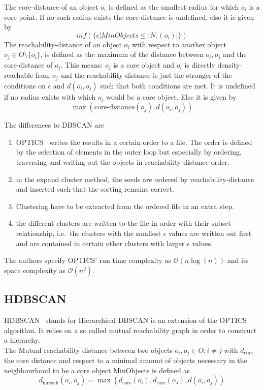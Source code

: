 \noindent The core-distance of an object $o_i$ is defined as the smallest radius for which $o_i$ is a core point. If no such radius exists the core-distance is undefined, else it is given by  \[ inf(\{\epsilon | MinObjects \leq |N_\epsilon(o_i)| \})\]
The reachability-distance of an object $o_i$ with respect to another object $o_j \in O\setminus \{o_i\}$, is defined as the maximum of the distance between $o_i, o_j$ and the core-distance of $o_j$. This means: $o_j$ is a core object and $o_i$ is directly density-reachable from $o_j$ and the reachability distance is just the stronger of the conditions on $\epsilon$ and $d(o_i, o_j)$ such that both conditions are met. It is undefined if no radius exists with which $o_j$ would be a core object. Else it is given by \[ \max(\text{core-distance}(o_j), d(o_i, o_j)) \]

\noindent The differences to DBSCAN are 
\begin{enumerate}
    \item OPTICS~\cite{optics} writes the results in a certain order to a file. The order is defined by the selection of elements in the outer loop but especially by ordering, traversing and writing out the objects in reachability-distance order.
    \item in the expand cluster method, the seeds are ordered by reachability-distance and inserted such that the sorting remains correct.
    \item Clustering have to be extracted from the ordered file in an extra step.
    \item the different clusters are written to the file in order with their subset relationship, i.e.~the clusters with the smallest $\epsilon$ values are written out first and are contained in certain other clusters with larger $\epsilon$ values.
\end{enumerate}
The authors specify OPTICS' run time complexity as $\mathcal{O}(n \log(n))$ and its space complexity as $\mathcal{O}(n^2)$.


\subsection{HDBSCAN}\label{\positionnumber}
HDBSCAN~\cite{hdbscan} stands for Hierarchical DBSCAN is an extension of the OPTICS algorithm. It relies on a so called mutual reachability graph in order to construct a hierarchy.\\

\noindent The Mutual reachability distance between two objects $o_i, o_j \in O, i \neq j$ with $d_{\text{core}}$ the core distance and respect to a minimal amount of objects necessary in the neighbourhood to be a core object MinObjects is defined as \[ d_{\text{mreach}}(o_i, o_j) = \max(d_{\text{core}}(o_i), d_{\text{core}}(o_J), d(o_i, o_j)) \]

